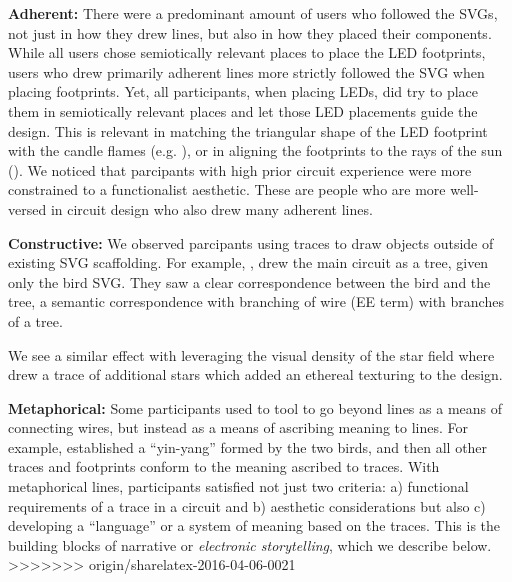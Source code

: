 \documentclass{sigchi}
\begin{document}
  
  \textbf{Adherent:}  There were a predominant amount of users who followed the SVGs, not just in how they drew lines, but also in how they placed their components. While all users chose semiotically relevant places to place the LED footprints, users who drew primarily adherent lines more strictly followed the SVG when placing footprints. Yet, all participants, when placing LEDs, did try to place them in semiotically relevant places and let those LED placements guide the design. This is relevant in matching the triangular shape of the LED footprint with the candle flames (e.g. ), or in aligning the footprints to the rays of the sun (). We noticed that parcipants with high prior circuit experience were more constrained to a functionalist aesthetic. These are people who are more well-versed in circuit design who also drew many adherent lines.
  
  \textbf{Constructive:} We observed parcipants using traces to draw objects outside of existing SVG scaffolding. For example, , drew the main circuit as a tree, given only the bird SVG. They saw a clear correspondence between the bird and the tree, a semantic correspondence with branching of wire (EE term) with branches of a tree.
  
  
  We see a similar effect with leveraging the visual density of the star field where  drew a trace of additional stars which added an ethereal texturing to the design.
  
  \textbf{Metaphorical:} Some participants used to tool to go beyond lines as a means of connecting wires, but instead as a means of ascribing meaning to lines. For example,  established a ``yin-yang'' formed by the two birds, and then all other traces and footprints conform to the meaning ascribed to traces. With metaphorical lines, participants satisfied not just two criteria: a) functional requirements of a trace in a circuit and b) aesthetic considerations but also c) developing a ``language'' or a system of meaning based on the traces.
  This is the building blocks of narrative or \textit{electronic storytelling}, which we describe below.
>>>>>>> origin/sharelatex-2016-04-06-0021
\end{document}
